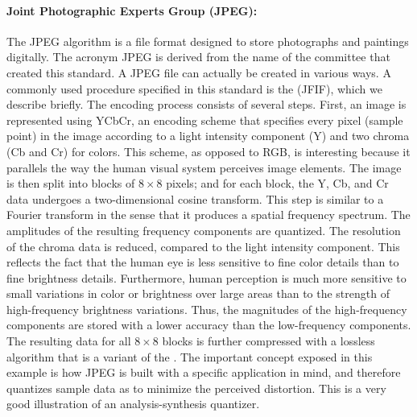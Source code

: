 \paragraph{Joint Photographic Experts Group (JPEG):}
The JPEG algorithm is a file format designed to store photographs and paintings digitally.
The acronym JPEG is derived from the name of the committee that created this standard.
A JPEG file can actually be created in various ways.
A commonly used procedure specified in this standard is the  (JFIF), which we describe briefly.
The encoding process consists of several steps.
First, an image is represented using YCbCr, an encoding scheme that specifies every pixel (sample point) in the image according to a light intensity component (Y) and two chroma (Cb and Cr) for colors.
This scheme, as opposed to RGB, is interesting because it parallels the way the human visual system perceives image elements.
The image is then split into blocks of $8 \times 8$ pixels; and for each block, the Y, Cb, and Cr data undergoes a two-dimensional cosine transform.
This step is similar to a Fourier transform in the sense that it produces a spatial frequency spectrum.
The amplitudes of the resulting frequency components are quantized.
The resolution of the chroma data is reduced, compared to the light intensity component.
This reflects the fact that the human eye is less sensitive to fine color details than to fine brightness details.
Furthermore, human perception is much more sensitive to small variations in color or brightness over large areas than to the strength of high-frequency brightness variations.
Thus, the magnitudes of the high-frequency components are stored with a lower accuracy than the low-frequency components.
The resulting data for all $8 \times 8$ blocks is further compressed with a lossless algorithm that is a variant of the .
The important concept exposed in this example is how JPEG is built with a specific application in mind, and therefore quantizes sample data as to minimize the perceived distortion.
This is a very good illustration of an analysis-synthesis quantizer.


